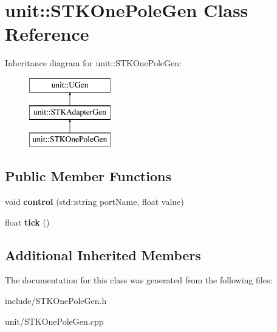 \hypertarget{classunit_1_1STKOnePoleGen}{}\section{unit\+:\+:S\+T\+K\+One\+Pole\+Gen Class Reference}
\label{classunit_1_1STKOnePoleGen}
Inheritance diagram for unit\+:\+:S\+T\+K\+One\+Pole\+Gen\+:\begin{figure}[H]
\begin{center}
\leavevmode
\includegraphics[height=3.000000cm]{classunit_1_1STKOnePoleGen}
\end{center}
\end{figure}
\subsection*{Public Member Functions}
\begin{DoxyCompactItemize}
\item 
void {\bfseries control} (std\+::string port\+Name, float value)\hypertarget{classunit_1_1STKOnePoleGen_abafc7a64770438cbde61518a7cf2d94b}{}\label{classunit_1_1STKOnePoleGen_abafc7a64770438cbde61518a7cf2d94b}

\item 
float {\bfseries tick} ()\hypertarget{classunit_1_1STKOnePoleGen_a3bc702fbc334d94eebd409755d1d74e8}{}\label{classunit_1_1STKOnePoleGen_a3bc702fbc334d94eebd409755d1d74e8}

\end{DoxyCompactItemize}
\subsection*{Additional Inherited Members}


The documentation for this class was generated from the following files\+:\begin{DoxyCompactItemize}
\item 
include/S\+T\+K\+One\+Pole\+Gen.\+h\item 
unit/S\+T\+K\+One\+Pole\+Gen.\+cpp\end{DoxyCompactItemize}
